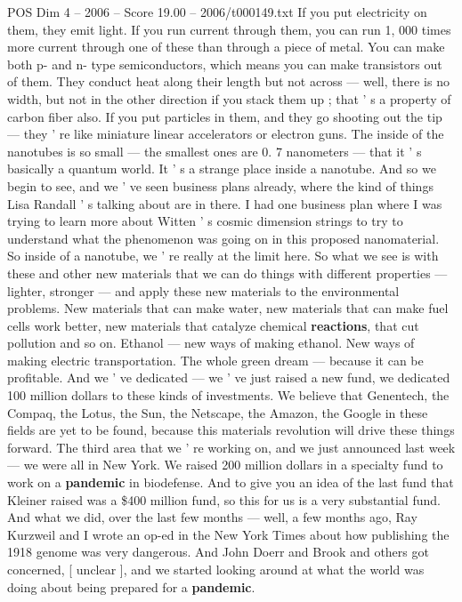\begin{textsample}{POS Dim 4 – 2006 – Score 19.00 – 2006/t000149.txt}
If you put electricity on them, they emit light.
If you run current through them, you can run 1, 000 times more current through one of these than through a piece of metal.
You can make both p- and n- type semiconductors, which means you can make transistors out of them.
They conduct heat along their length but not across — well, there is no width, but not in the other direction if you stack them up ; that ' s a property of carbon fiber also.
If you put particles in them, and they go shooting out the tip — they ' re like miniature linear accelerators or electron guns.
The inside of the nanotubes is so small — the smallest ones are 0. 7 nanometers — that it ' s basically a quantum world.
It ' s a strange place inside a nanotube.
And so we begin to see, and we ' ve seen business plans already, where the kind of things Lisa Randall ' s talking about are in there.
I had one business plan where I was trying to learn more about Witten ' s cosmic dimension strings to try to understand what the phenomenon was going on in this proposed nanomaterial.
So inside of a nanotube, we ' re really at the limit here.
So what we see is with these and other new materials that we can do things with different properties — lighter, stronger — and apply these new materials to the environmental problems.
New materials that can make water, new materials that can make fuel cells work better, new materials that catalyze chemical \textbf{reactions}, that cut pollution and so on.
Ethanol — new ways of making ethanol.
New ways of making electric transportation.
The whole green dream — because it can be profitable.
And we ' ve dedicated — we ' ve just raised a new fund, we dedicated 100 million dollars to these kinds of investments.
We believe that Genentech, the Compaq, the Lotus, the Sun, the Netscape, the Amazon, the Google in these fields are yet to be found, because this materials revolution will drive these things forward.
The third area that we ' re working on, and we just announced last week — we were all in New York.
We raised 200 million dollars in a specialty fund to work on a \textbf{pandemic} in biodefense.
And to give you an idea of the last fund that Kleiner raised was a \$400 million fund, so this for us is a very substantial fund.
And what we did, over the last few months — well, a few months ago, Ray Kurzweil and I wrote an op-ed in the New York Times about how publishing the 1918 genome was very dangerous.
And John Doerr and Brook and others got concerned, [ unclear ], and we started looking around at what the world was doing about being prepared for a \textbf{pandemic}.

\end{textsample}
